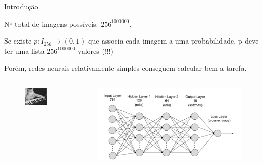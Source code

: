 \documentclass{beamer}
\begin{document}
\begin{frame}{Introdução}
    \pause

    \vspace{1em}

    Nº total de imagens possíveis: $256^{1000000}$.

    \pause
    \vspace{1em}

    Se existe $p: I_{256} \to (0,1)$ que associa cada imagem a uma probabilidade, p deve ter uma lista $256^{1000000}$ valores (!!!)
\end{frame}

\begin{frame}
    Porém, redes neurais relativamente simples conseguem calcular bem a tarefa.
    
    \small

    \begin{columns}
        \begin{column}{0.3\textwidth}
            \begin{figure}
                \includegraphics[width=\textwidth]{fig/keyboard-cat.png}
            \end{figure}
        \end{column}
        \begin{column}{0.3\textwidth}
            \begin{figure}
                \includegraphics[width=\textwidth]{fig/nn.png}

\end{figure}
\end{column}
\end{columns}
\end{frame}
\end{document}
